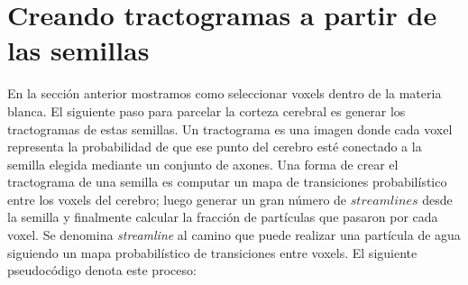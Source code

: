 \section{Creando tractogramas a partir de las semillas}
\label{sec:tractogramas}

En la secci\'on anterior mostramos como seleccionar voxels dentro de la 
materia blanca. El siguiente paso para parcelar la corteza cerebral es 
generar los tractogramas de estas semillas.
Un tractograma es una imagen donde cada voxel representa la probabilidad de
que ese punto del cerebro est\'e conectado a la semilla elegida mediante un
conjunto de axones. Una forma de crear el tractograma de una semilla es
computar un mapa de transiciones probabil\'istico entre los voxels del
cerebro; luego generar un gran n\'umero de $streamlines$ desde la semilla y
finalmente calcular la fracci\'on de part\'iculas que pasaron por cada 
voxel. Se denomina \textit{streamline} al camino que puede realizar una 
part\'icula de agua siguiendo un mapa probabil\'is\-tico de transiciones
entre voxels. El siguiente pseudoc\'odigo denota este proceso:\\

\newlength\mylen
\settowidth{}
\addtolength\mylen{\parindent}

